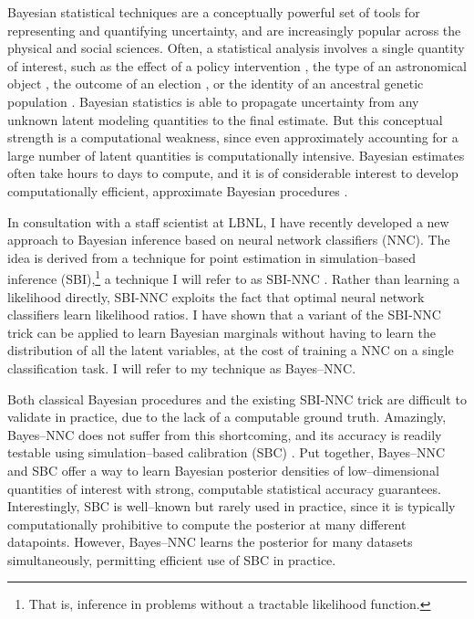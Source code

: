 Bayesian statistical techniques are a conceptually powerful set of tools for
representing and quantifying uncertainty, and are increasingly popular across
the physical and social sciences.  Often, a statistical analysis involves a
single quantity of interest, such as the effect of a policy intervention
\citep{meager:2019:microcredit}, the type of an astronomical object
\citep{regier:2019:cataloging}, the outcome of an election
\citep{economist:2020:election}, or the identity of an ancestral genetic
population \citep{pritchard:2000:inference}.  Bayesian statistics is able to
propagate uncertainty from any unknown latent modeling quantities to the final
estimate.  But this conceptual strength is a computational weakness, since even
approximately accounting for a large number of latent quantities is
computationally intensive. Bayesian estimates often take hours to days to
compute, and it is of considerable interest to develop computationally
efficient, approximate Bayesian procedures \citep{blei:2017:variational,aabi}.

In consultation with a staff scientist at LBNL, I have recently developed a new
approach to Bayesian inference based on neural network classifiers (NNC). The
idea is derived from a technique for point estimation in simulation--based
inference (SBI),\footnote{That is, inference in problems without a tractable
likelihood function.} a technique I will refer to as SBI-NNC
\citep{cranmer:2020:frontierofsimulation}.  Rather than learning a likelihood
directly, SBI-NNC exploits the fact that optimal neural network classifiers
learn likelihood ratios. I have shown that a variant of the SBI-NNC trick can be
applied to learn Bayesian marginals without having to learn the distribution of
all the latent variables, at the cost of training a NNC on a single
classification task.  I will refer to my technique as Bayes--NNC.

Both classical Bayesian procedures and the existing SBI-NNC trick are difficult
to validate in practice, due to the lack of a computable ground truth.
Amazingly, Bayes--NNC does not suffer from this shortcoming, and its accuracy is
readily testable using simulation--based calibration (SBC)
\citep{talts:2018:sbc}.  Put together, Bayes--NNC and SBC offer a way to learn
Bayesian posterior densities of low--dimensional quantities of interest with
strong, computable statistical accuracy guarantees. Interestingly, SBC is
well--known but rarely used in practice, since it is typically computationally
prohibitive to compute the posterior at many different datapoints.  However,
Bayes--NNC learns the posterior for many datasets simultaneously, permitting
efficient use of SBC in practice.  

